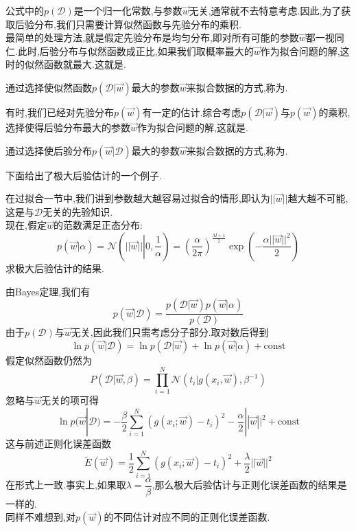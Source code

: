 \documentclass{ctexart}
\begin{document}
公式中的$p(\mathcal{D})$是一个归一化常数,与参数$\vec{w}$无关,通常就不去特意考虑.因此,为了获取后验分布,我们只需要计算似然函数与先验分布的乘积.\\
\indent 最简单的处理方法,就是假定先验分布是均匀分布,即对所有可能的参数$\vec{w}$都一视同仁.此时,后验分布与似然函数成正比,如果我们取概率最大的$\vec{w}$作为拟合问题的解,这时的似然函数就最大.这就是.
\begin{definition}[极大似然估计]
    通过选择使似然函数$p\left(\mathcal{D}|\vec{w}\right)$最大的参数$\vec{w}$来拟合数据的方式,称为.
\end{definition}
\indent 有时,我们已经对先验分布$p(\vec{w})$有一定的估计.综合考虑$p(\mathcal{D}|\vec{w})$与$p(\vec{w})$的乘积,选择使得后验分布最大的参数$\vec{w}$作为拟合问题的解,这就是.
\begin{definition}[极大后验估计]
    通过选择使后验分布$p\left(\vec{w}|\mathcal{D}\right)$最大的参数$\vec{w}$来拟合数据的方式,称为.
\end{definition}
下面给出了极大后验估计的一个例子.
\begin{problem}
    在过拟合一节中,我们讲到参数越大越容易过拟合的情形,即认为$||\vec{w}||$越大越不可能,这是与$\mathcal{D}$无关的先验知识.\\
    现在,假定$\vec{w}$的范数满足正态分布:
    \[p\left(\vec{w}|\alpha\right)=\mathcal{N}\left(||\vec{w}||\left|0,\frac{1}{\alpha}\right.\right)=\left(\dfrac{\alpha}{2\pi}\right)^{\frac{M+1}{2}}\exp\left(-\dfrac{\alpha||\vec{w}||^2}{2}\right)\]
    求极大后验估计的结果.
\end{problem}
\begin{solution}
    由Bayes定理,我们有
    \[p(\vec{w}|\mathcal{D})=\dfrac{p(\mathcal{D}|\vec{w})p(\vec{w}|\alpha)}{p(\mathcal{D})}\]
    由于$p(\mathcal{D})$与$\vec{w}$无关,因此我们只需考虑分子部分.取对数后得到
    \[\ln p(\vec{w}|\mathcal{D})=\ln p(\mathcal{D}|\vec{w})+\ln p(\vec{w}|\alpha)+\text{const}\]
    假定似然函数仍然为
    \[P\left(\mathcal{D}|\vec{w},\beta\right)=\prod_{i=1}^{N}\mathcal{N}\left(t_i|g\left(x_i,\vec{w}\right),\beta^{-1}\right)\]
    忽略与$\vec{w}$无关的项可得
    \[\ln p(\vec{w}|\mathcal{D})=-\dfrac{\beta}{2}\sum_{i=1}^{N}\left(g\left(x_i;\vec{w}\right)-t_i\right)^2-\dfrac{\alpha}{2}||\vec{w}||^2+\text{const}\]
    这与前述正则化误差函数
    \[\tilde{E}(\vec{w})=\dfrac12\sum_{i=1}^{N}\left(g(x_i;\vec{w})-t_i\right)^2+\dfrac{\lambda}{2}||\vec{w}||^2\]
    在形式上一致.事实上,如果取$\lambda=\dfrac{\alpha}{\beta}$,那么极大后验估计与正则化误差函数的结果是一样的.\\
    \indent 同样不难想到,对$p(\vec{w})$的不同估计对应不同的正则化误差函数.
\end{solution}
\end{document}
